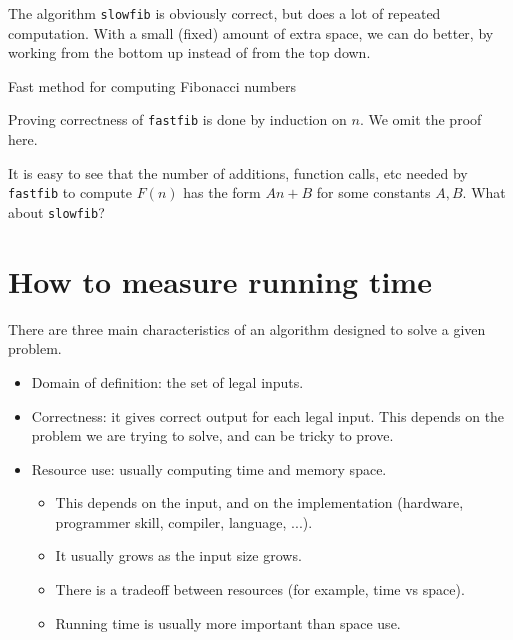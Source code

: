 The algorithm \texttt{slowfib} %
is obviously correct, but does a lot of repeated computation. 
With a small (fixed) amount of extra space, we can do better, by 
working from the bottom up instead of from the top down.

\begin{algorithm}[H]
  \caption{Fast method for computing Fibonacci numbers
    \label{alg:fastfib}}
\begin{algorithmic}[1]
\Else
{} 
  
\EndFor
\EndIf
\State {}
\EndFunction
\end{algorithmic}
\end{algorithm}
 
Proving correctness of \texttt{fastfib} is done by induction on $n$.  We omit the proof here.
\begin{Boxample}[6]
It is easy to see that the number of additions, function calls, etc needed by 
\texttt{fastfib} to compute $F(n)$ has the form $An+B$ for some constants $A, B$.
What about \texttt{slowfib}?

\end{Boxample}


\chapter{How to measure running time} %

There are three main characteristics of an algorithm designed to solve a given 
problem.
\begin{itemize}
\item Domain of definition: the set of legal inputs. 
\item Correctness: it gives correct output for each legal input. 
This depends on the problem we are trying to solve, and can be tricky to prove. 
\item Resource use: usually computing time and memory space. 
\begin{itemize} 
\item This depends on the input, and on the implementation 
(hardware, programmer skill, compiler, language, ...). 
\item It usually grows as the input size grows. 
\item There is a tradeoff between resources (for example, time vs space). 
\item Running time is usually more important than space use. 
\end{itemize}
\end{itemize}

